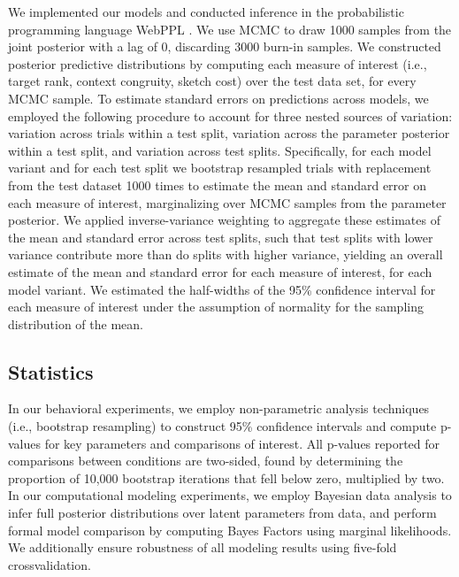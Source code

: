 \documentclass{svjour3}
\begin{document}
We implemented our models and conducted inference in the probabilistic programming language WebPPL \citep*{goodman2014design}.
We use MCMC to draw 1000 samples from the joint posterior with a lag of 0, discarding 3000 burn-in samples.
We constructed posterior predictive distributions by computing each measure of interest (i.e., target rank, context congruity, sketch cost) over the test data set, for every MCMC sample.
To estimate standard errors on predictions across models, we employed the following procedure to account for three nested sources of variation: variation across trials within a test split, variation across the parameter posterior within a test split, and variation across test splits.  
Specifically, for each model variant and for each test split we bootstrap resampled trials with replacement from the test dataset 1000 times to estimate the mean and standard error on each measure of interest, marginalizing over MCMC samples from the parameter posterior. 
We applied inverse-variance weighting to aggregate these estimates of the mean and standard error across test splits, such that test splits with lower variance contribute more than do splits with higher variance, yielding an overall estimate of the mean and standard error for each measure of interest, for each model variant. 
We estimated the half-widths of the 95\% confidence interval for each measure of interest under the assumption of normality for the sampling distribution of the mean.

\subsection*{Statistics}

In our behavioral experiments, we employ non-parametric analysis techniques (i.e., bootstrap resampling) to construct 95\% confidence intervals and compute p-values for key parameters and comparisons of interest. All p-values reported for comparisons between conditions are two-sided, found by determining the proportion of 10,000 bootstrap iterations that fell below zero, multiplied by two. In our computational modeling experiments, we employ Bayesian data analysis to infer full posterior distributions over latent parameters from data, and perform formal model comparison by computing Bayes Factors using marginal likelihoods. We additionally ensure robustness of all modeling results using five-fold crossvalidation. 
\end{document}
